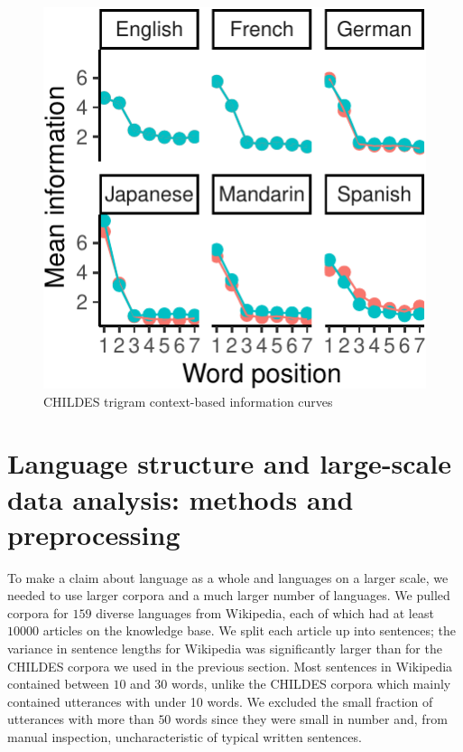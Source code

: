 \documentclass[man,floatsintext]{apa6}
\begin{document}
\begin{figure}
\centering
\includegraphics{figs/unnamed-chunk-3-1.pdf}
\caption{\label{fig:unnamed-chunk-3}CHILDES trigram context-based information curves}
\end{figure}

\hypertarget{language-structure-and-large-scale-data-analysis-methods-and-preprocessing}{%
\section{Language structure and large-scale data analysis: methods and preprocessing}\label{language-structure-and-large-scale-data-analysis-methods-and-preprocessing}}

To make a claim about language as a whole and languages on a larger scale, we needed to use larger corpora and a much larger number of languages. We pulled corpora for \(159\) diverse languages from Wikipedia, each of which had at least \(10000\) articles on the knowledge base. We split each article up into sentences; the variance in sentence lengths for Wikipedia was significantly larger than for the CHILDES corpora we used in the previous section. Most sentences in Wikipedia contained between \(10\) and \(30\) words, unlike the CHILDES corpora which mainly contained utterances with under 10 words. We excluded the small fraction of utterances with more than \(50\) words since they were small in number and, from manual inspection, uncharacteristic of typical written sentences.
\end{document}
